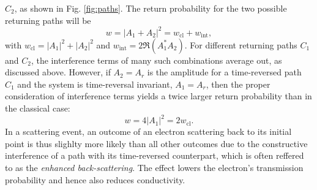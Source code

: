 \documentclass[10pt,a4paper]{article}
\begin{document}
 $C_2$, as shown in Fig. \ref{fig:paths}. The return probability for the two possible returning paths will be 
\begin{equation}
w=|A_1 + A_2|^2=w_\mathrm{cl} + w_\mathrm{int},
\end{equation}
with $w_\mathrm{cl}=|A_1|^2 + |A_2|^2$ and $w_\mathrm{int}=2\Re\left(A_1^*A_2\right)$. For different returning paths $C_1$ and $C_2$, the interference terms of many such combinations average out, as discussed above. However, if $A_2=A_r$ is the amplitude for a time-reversed path $C_1$ and the system is time-reversal invariant, $A_1=A_r$, then the proper consideration of interference terms yields a twice larger return probability than in the classical case:
\begin{equation}
w=4|A_1|^2=2w_\mathrm{cl}.
\end{equation}
In a scattering event, an outcome of an electron scattering back to its initial point is thus slighlty more likely than all other outcomes due to the constructive interference of a path with its time-reversed counterpart, which is often reffered to as the \emph{enhanced back-scattering}. The effect lowers the electron's transmission probability and hence also reduces conductivity. 
\end{document}

